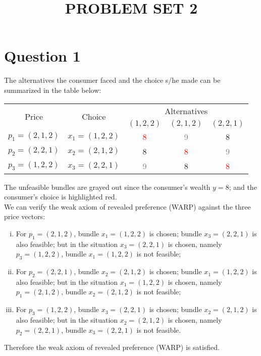 \documentclass{article}
\title{PROBLEM SET 2}
\date{}
\begin{document}
\maketitle

\section*{Question 1}

The alternatives the consumer faced and the choice s/he made can be summarized in the table below:
    
\begin{table}[h]
    \centering
    \begin{tabular}{ccccc}
    \hline\hline
    \multirow{2}{*}{Price} & \multirow{2}{*}{Choice}  & \multicolumn{3}{c}{Alternatives} \\\cline{3-5}
                          &                         & $(1,2,2)$ & $(2,1,2)$ & $(2,2,1)$ \\
    \hline
    $p_1=(2,1,2)$         & $x_1=(1,2,2)$           & \textcolor{red}{8} & \textcolor{gray}{9} & 8 \\
    $p_2=(2,2,1)$         & $x_2=(2,1,2)$           & 8 & \textcolor{red}{8} & \textcolor{gray}{9} \\
    $p_3=(1,2,2)$         & $x_3=(2,2,1)$           & \textcolor{gray}{9} & 8 & \textcolor{red}{8} \\
    \hline
    \end{tabular}
\end{table}

The unfeasible bundles are grayed out since the consumer's wealth $y=8$; 
and the consumer's choice is highlighted red. \\

We can verify the weak axiom of revealed preference (WARP) against the three price vectors:
{\small
\begin{enumerate}[(i)]
    \item For $p_1=(2,1,2)$, bundle $x_1=(1,2,2)$ is chosen; bundle $x_3=(2,2,1)$ is also feasible; 
          but in the situation $x_3=(2,2,1)$ is chosen, namely $p_3=(1,2,2)$, bundle  $x_1=(1,2,2)$
          is not feasible;
    \item For $p_2=(2,2,1)$, bundle $x_2=(2,1,2)$ is chosen; bundle $x_1=(1,2,2)$ is also feasible; 
          but in the situation $x_1=(1,2,2)$ is chosen, namely $p_1=(2,1,2)$, bundle $x_2=(2,1,2)$
          is not feasible;
    \item For $p_3=(1,2,2)$, bundle $x_3=(2,2,1)$ is chosen; bundle $x_2=(2,1,2)$ is also feasible;
          but in the situation $x_2=(2,1,2)$ is chosen, namely $p_2=(2,2,1)$, bundle $x_3=(2,2,1)$
          is not feasible.
\end{enumerate}
}
Therefore the weak axiom of revealed preference (WARP) is satisfied. \\
\end{document}
